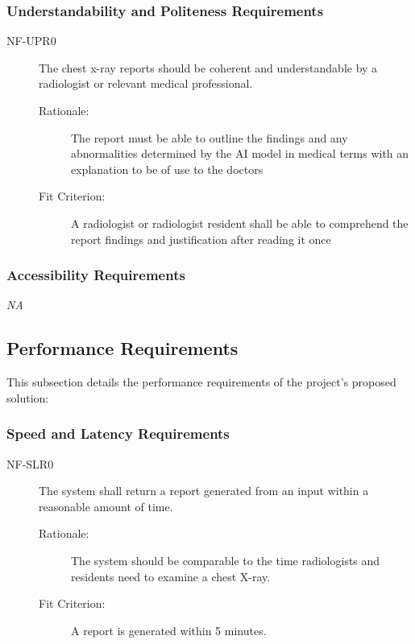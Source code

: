 \documentclass[12pt]{article}
\begin{document}
\subsubsection{Understandability and Politeness Requirements}
\begin{description}
    \item[NF-UPR0] The chest x-ray reports should be coherent and understandable by a radiologist or relevant medical professional. 
    \begin{description}
        \item[Rationale:] The report must be able to outline the findings and any abnormalities determined by the AI model in medical terms with an explanation to be of use to the doctors
        \item[Fit Criterion:] A radiologist or radiologist resident shall be able to comprehend the report findings and justification after reading it once
    \end{description}
\end{description}

\subsubsection{Accessibility Requirements}
\textit{NA}

\subsection{Performance Requirements}
This subsection details the performance requirements of the project's proposed solution:

\subsubsection{Speed and Latency Requirements}
\begin{description}
    \item[NF-SLR0] The system shall return a report generated from an input within a reasonable amount of time. 
    \begin{description}
        \item[Rationale:] The system should be comparable to the time radiologists and residents need to examine a chest X-ray.  
        \item[Fit Criterion:] A report is generated within 5 minutes.
    \end{description}
\end{description}
\end{document}
